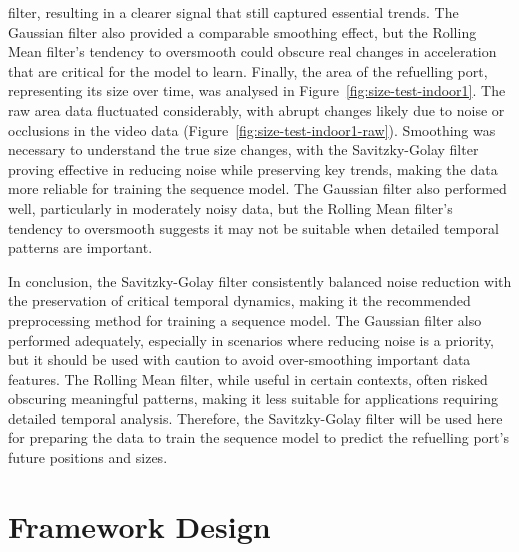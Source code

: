 \documentclass[12pt,oneside]{book} %
\begin{document}
filter, resulting in a clearer signal that still captured essential trends. The
Gaussian filter also provided a comparable smoothing effect, but the Rolling
Mean filter’s tendency to oversmooth could obscure real changes in acceleration
that are critical for the model to learn. Finally, the area of the refuelling port, representing its size over time, was
analysed in Figure~\ref{fig:size-test-indoor1}. The raw area data fluctuated
considerably, with abrupt changes likely due to noise or occlusions in the
video data (Figure~\ref{fig:size-test-indoor1-raw}). Smoothing was necessary to
understand the true size changes, with the Savitzky-Golay filter proving
effective in reducing noise while preserving key trends, making the data more
reliable for training the sequence model. The Gaussian filter also performed
well, particularly in moderately noisy data, but the Rolling Mean filter’s
tendency to oversmooth suggests it may not be suitable when detailed temporal
patterns are important.

In conclusion, the Savitzky-Golay filter consistently balanced noise reduction
with the preservation of critical temporal dynamics, making it the recommended
preprocessing method for training a sequence model. The Gaussian filter also
performed adequately, especially in scenarios where reducing noise is a
priority, but it should be used with caution to avoid over-smoothing important
data features. The Rolling Mean filter, while useful in certain contexts, often
risked obscuring meaningful patterns, making it less suitable for applications
requiring detailed temporal analysis. Therefore, the Savitzky-Golay filter will
be used here for preparing the data to train the sequence model to predict the
refuelling port’s future positions and sizes.

\section{Framework Design}
\end{document}
